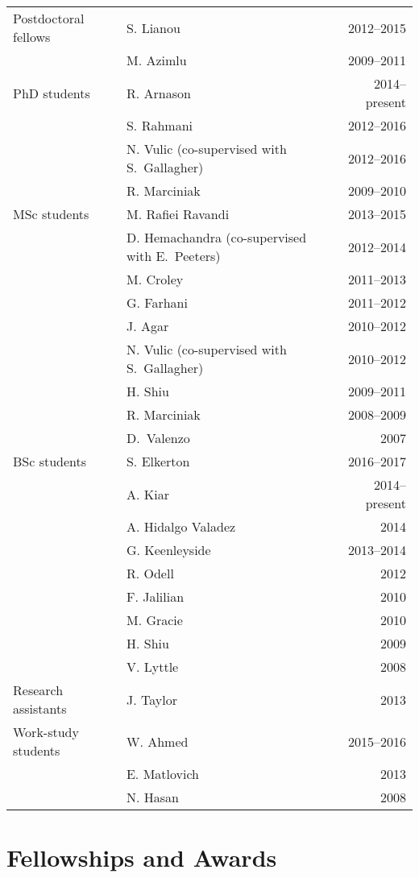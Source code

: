 \documentclass[12pt]{article}
\begin{document}
\begin{tabularx}{\textwidth}{p{5cm}Xr}
Postdoctoral fellows 
& S. Lianou & 2012--2015\\
& M. Azimlu & 2009--2011\\
PhD students 
&  R. Arnason & 2014--present\\
&S. Rahmani& 2012--2016 \\
&N. Vulic (co-supervised with S.\ Gallagher) & 2012--2016 \\
&R. Marciniak & 2009--2010 \\
MSc students 
& M. Rafiei Ravandi& 2013--2015\\
& D. Hemachandra (co-supervised with E.\ Peeters)& 2012--2014\\
& M. Croley& 2011--2013\\
& G. Farhani& 2011--2012\\
 & J. Agar& 2010--2012\\
& N. Vulic (co-supervised with S.\ Gallagher)& 2010--2012\\
& H. Shiu& 2009--2011\\
& R. Marciniak& 2008--2009\\
& D.\ Valenzo& 2007\\
BSc students
& S. Elkerton&  2016--2017\\
& A. Kiar & 2014--present\\
& A. Hidalgo Valadez & 2014\\
& G. Keenleyside& 2013--2014\\
& R. Odell& 2012\\
& F. Jalilian& 2010\\
& M. Gracie& 2010\\
& H. Shiu& 2009\\
& V. Lyttle& 2008\\
Research assistants 
& J. Taylor& 2013\\
Work-study students
& W. Ahmed & 2015--2016\\
& E. Matlovich& 2013\\
& N. Hasan& 2008\\
\end{tabularx}

\section{Fellowships and Awards}
\end{document}
